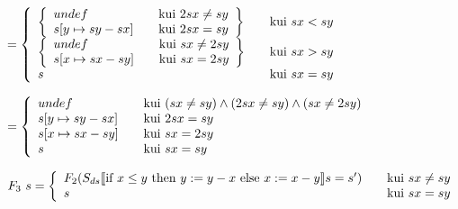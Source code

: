 \(
= 
\left\{ \begin{array}{l l}
    \left\{ \begin{array}{l l}
        undef & \quad \text{kui}\ 2sx \neq sy \\
        s[y \mapsto sy - sx] & \quad \text{kui}\ 2sx = sy
    \end{array} \right\} & \quad \text{kui}\ sx < sy
    \\
    \left\{ \begin{array}{l l}
        undef & \quad \text{kui}\ sx \neq 2sy \\
        s[x \mapsto sx - sy] & \quad \text{kui}\ sx = 2sy\\
    \end{array} \right\} & \quad \text{kui}\ sx > sy
  \\
  s
  & \quad \text{kui}\ sx = sy\\
  \end{array} \right.
\)

\(
= 
\left\{
  \begin{array}{l l}
  undef                & \quad \text{kui}\ (sx \neq sy) \wedge (2sx \neq sy) \wedge (sx \neq 2sy)\\
  s[y \mapsto sy - sx] & \quad \text{kui}\ 2sx = sy \\
  s[x \mapsto sx - sy] & \quad \text{kui}\ sx = 2sy \\
  s                    & \quad \text{kui}\ sx = sy\\
  \end{array}
\right.
\)


\(
F_3 \ s = \left\{
    \begin{array}{l l}
    F_2(
      S_{ds} \llbracket
        \text{if\ } x \leq y
        \text{\ then\ } y := y - x \text{\ else\ } x := x - y
      \rrbracket s = s'
    ) & \quad \text{kui}\ sx \neq sy \\
    s   & \quad \text{kui}\ sx = sy\\
  \end{array} \right.
\)
